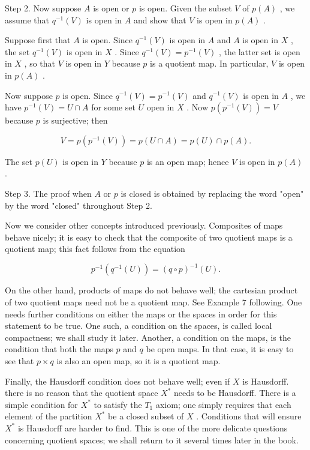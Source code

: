 Step 2. Now suppose \(A\) is open or \(p\) is open. Given the subset \(V\) of \(p\left( A\right)\) , we assume that \({q}^{-1}\left( V\right)\) is open in \(A\) and show that \(V\) is open in \(p\left( A\right)\) .

Suppose first that \(A\) is open. Since \({q}^{-1}\left( V\right)\) is open in \(A\) and \(A\) is open in \(X\) , the set \({q}^{-1}\left( V\right)\) is open in \(X\) . Since \({q}^{-1}\left( V\right)  = {p}^{-1}\left( V\right)\) , the latter set is open in \(X\) , so that \(V\) is open in \(Y\) because \(p\) is a quotient map. In particular, \(V\) is open in \(p\left( A\right)\) .

Now suppose \(p\) is open. Since \({q}^{-1}\left( V\right)  = {p}^{-1}\left( V\right)\) and \({q}^{-1}\left( V\right)\) is open in \(A\) , we have \({p}^{-1}\left( V\right)  = U \cap  A\) for some set \(U\) open in \(X\) . Now \(p\left( {{p}^{-1}\left( V\right) }\right)  = V\) because \(p\) is surjective; then

\[
V = p\left( {{p}^{-1}\left( V\right) }\right)  = p\left( {U \cap  A}\right)  = p\left( U\right)  \cap  p\left( A\right) .
\]

The set \(p\left( U\right)\) is open in \(Y\) because \(p\) is an open map; hence \(V\) is open in \(p\left( A\right)\) .

Step 3. The proof when \(A\) or \(p\) is closed is obtained by replacing the word "open" by the word "closed" throughout Step 2.

Now we consider other concepts introduced previously. Composites of maps behave nicely; it is easy to check that the composite of two quotient maps is a quotient map; this fact follows from the equation

\[
{p}^{-1}\left( {{q}^{-1}\left( U\right) }\right)  = {\left( q \circ  p\right) }^{-1}\left( U\right) .
\]

On the other hand, products of maps do not behave well; the cartesian product of two quotient maps need not be a quotient map. See Example 7 following. One needs further conditions on either the maps or the spaces in order for this statement to be true. One such, a condition on the spaces, is called local compactness; we shall study it later. Another, a condition on the maps, is the condition that both the maps \(p\) and \(q\) be open maps. In that case, it is easy to see that \(p \times  q\) is also an open map, so it is a quotient map.

Finally, the Hausdorff condition does not behave well; even if \(X\) is Hausdorff. there is no reason that the quotient space \({X}^{ * }\) needs to be Hausdorff. There is a simple condition for \({X}^{ * }\) to satisfy the \({T}_{1}\) axiom; one simply requires that each element of the partition \({X}^{ * }\) be a closed subset of \(X\) . Conditions that will ensure \({X}^{ * }\) is Hausdorff are harder to find. This is one of the more delicate questions concerning quotient spaces; we shall return to it several times later in the book.

